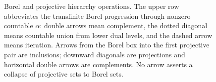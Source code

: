 \begin{figure}[!htbp]
\caption{Borel and projective hierarchy operations.
The upper row abbreviates the transfinite Borel progression through nonzero
countable \(\alpha\): double arrows mean complement, the dotted diagonal means
countable union from lower dual levels, and the dashed arrow means iteration.
Arrows from the Borel box into the first projective pair are inclusions;
downward diagonals are projections and horizontal double arrows are
complements.  No arrow asserts a collapse of projective sets to Borel sets.}
\label{fig:p06-borel-projective}
\end{figure}

